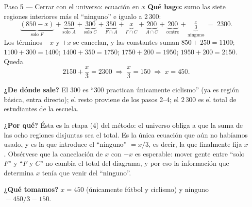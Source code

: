 \documentclass[11pt]{article}
\begin{document}
\begin{paso}{Paso 5 --- Cerrar con el universo: ecuación en $x$}
\textbf{Qué hago:} sumo las siete regiones interiores más el ``ninguno'' e igualo a $2\,300$:
\[
\underbrace{(850-x)}_{\text{solo }F}+\underbrace{250}_{\text{solo }A}+\underbrace{300}_{\text{solo }C}
+\underbrace{350}_{F\cap A}+\underbrace{x}_{F\cap C}+\underbrace{200}_{A\cap C}
+\underbrace{200}_{\text{centro}}+\underbrace{\tfrac{x}{3}}_{\text{ninguno}} \;=\; 2300 .
\]
Los términos $-x$ y $+x$ se cancelan, y las constantes suman
$850+250=1100$; $1100+300=1400$; $1400+350=1750$; $1750+200=1950$; $1950+200=2150$. Queda
\[
2150+\frac{x}{3}=2300 \;\Longrightarrow\; \frac{x}{3}=150 \;\Longrightarrow\; x=450 .
\]

\textbf{¿De dónde sale?} El $300$ es ``300 practican únicamente ciclismo'' (ya es región básica, entra
directo); el resto proviene de los pasos 2--4; el $2\,300$ es el total de estudiantes de la escuela.

\textbf{¿Por qué?} Ésta es la etapa (4) del método: el universo obliga a que la suma de las ocho regiones
disjuntas sea el total. Es la única ecuación que aún no habíamos usado, y es la que introduce el ``ninguno''
$=x/3$, es decir, la que finalmente fija $x$. Obsérvese que la cancelación de $x$ con $-x$ es esperable:
mover gente entre ``solo $F$'' y ``$F$ y $C$'' no cambia el total del diagrama, y por eso la información
que determina $x$ tenía que venir del ``ninguno''.

\textbf{¿Qué tomamos?} $x=450$ (únicamente fútbol y ciclismo) y ninguno $=450/3=150$.
\end{paso}
\end{document}
